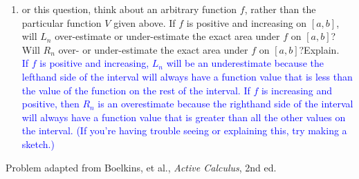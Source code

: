 \documentclass{ximera}
\begin{document}
\begin{exercise}
\begin{enumerate}
    \textcolor{orange}{The reasoning part of this question is deeper than most students have probably gone with this content. It never hurts to ask students to sketch out the situation (with the rectangles) to reinforce their thinking. The hope is that the would notice that the midpoint (in the $x$-direction) is not always the midpoint in the $y$-direction.}
    \item or this question, think about an arbitrary function $f$, rather than the particular function $V$ given above. If $f$ is positive and increasing on $[a,b]$, will $L_n$ over-estimate or under-estimate the exact area under $f$ on $[a,b]$?  Will  $R_n$ over- or under-estimate the exact area under $f$ on $[a,b]$?Explain.\\
    \textcolor{blue}{If $f$ is positive and increasing, $L_n$ will be an underestimate because the lefthand side of the interval will always have a function value that is less than the value of the function on the rest of the interval.  If $f$ is increasing and positive, then $R_n$ is an overestimate because the righthand side of the interval will always have a function value that is greater than all the other values on the interval.  (If you're having trouble seeing or explaining this, try making a sketch.) }
 \end{enumerate}
Problem adapted from Boelkins, et al., \textit{Active Calculus}, 2nd ed. 

\end{exercise}
\end{document}
